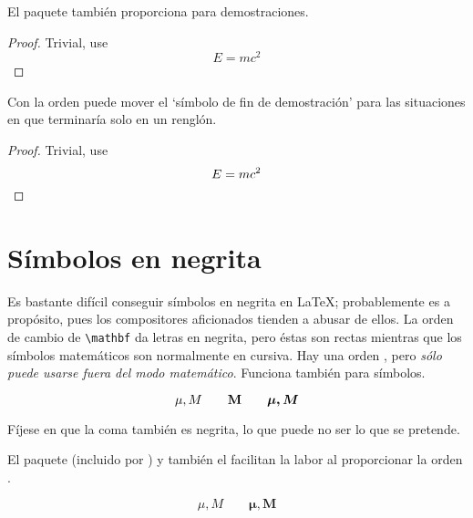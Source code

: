 El paquete  también proporciona  para demostraciones.

\begin{example}
\begin{proof}
 Trivial, use
\[E=mc^2\]
\end{proof}
\end{example}

Con la orden  puede mover el `símbolo de fin de demostración' para las situaciones en que terminaría solo en un renglón.

\begin{example}
\begin{proof}
 Trivial, use
\[E=mc^2 \qedhere\]
\end{proof}
\end{example}

\section{Símbolos en negrita}

Es bastante difícil conseguir símbolos en negrita en  \LaTeX{}; probablemente es a propósito, pues los compositores aficionados tienden a abusar de ellos.  La orden de cambio de \fontnomo{} \verb|\mathbf| da letras en negrita, pero éstas son rectas mientras que los símbolos matemáticos son normalmente en cursiva.  Hay una orden , pero \emph{sólo puede usarse fuera del modo matemático}.  Funciona también para símbolos.
\begin{example}
\begin{displaymath}
\mu, M \qquad \mathbf{M} \qquad
\mbox{\boldmath $\mu, M$}
\end{displaymath}
\end{example}

Fíjese en que la coma también es negrita, lo que puede no ser lo que se pretende.

El paquete  (incluido por ) y también el  facilitan la labor al proporcionar la orden .
\ifx\boldsymbol\undefined\else
\begin{example}
\begin{displaymath}
\mu, M \qquad
\boldsymbol{\mu}, \boldsymbol{M}
\end{displaymath}
\end{example}
\fi

%

